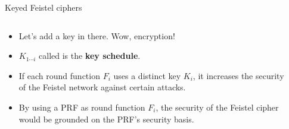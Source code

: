 \documentclass[aspectratio=169, lualatex, handout]{beamer}
\begin{document}
\begin{frame}{Keyed Feistel ciphers}
	\begin{columns}[c]
		\begin{column}{0.6\textwidth}
			\begin{itemize}[<+->]
				\item Let's add a key in there. Wow, encryption!
				\item $K_{1\cdots i}$ called is the \textbf{key schedule}.
				\item If each round function $F_i$ uses a distinct key $K_i$, it increases the security of the Feistel network against certain attacks.
				\item By using a PRF as round function $F_i$, the security of the Feistel cipher would be grounded on the PRF's security basis.
			\end{itemize}
		\end{column}
		\begin{column}{0.4\textwidth}
			\begin{center}
			\end{center}
		\end{column}
	\end{columns}
\end{frame}
\end{document}
